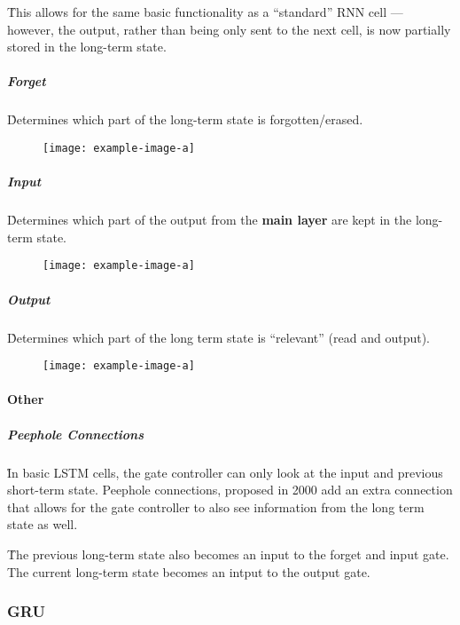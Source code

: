 \r{This allows for the same basic functionality as a ``standard'' RNN cell --- however, the output, rather than being only sent to the next cell, is now partially stored in the long-term state.}


\subparagraph{Forget}

\r{Determines which part of the long-term state is forgotten/erased.}

\begin{figure}
	\centering
	\texttt{[image: example-image-a]}\hfil
	\caption{}
\end{figure}



\subparagraph{Input}

\r{Determines which part of the output from the \textbf{main layer} are kept in the long-term state.}

\begin{figure}
	\centering
	\texttt{[image: example-image-a]}\hfil
	\caption{}
\end{figure}

\subparagraph{Output}

\r{Determines which part of the long term state is ``relevant'' (read and output).}

\begin{figure}
	\centering
	\texttt{[image: example-image-a]}\hfil
	\caption{}
\end{figure}


\paragraph{Other}

\subparagraph{Peephole Connections}

\r{In basic LSTM cells, the gate controller can only look at the input and previous short-term state. Peephole connections, proposed in 2000  add an extra connection that allows for the gate controller to also see information from the long term state as well. }

\r{The previous long-term state also becomes an input to the forget and input gate. The current long-term state becomes an intput to the output gate.}



\subsubsection{GRU}

